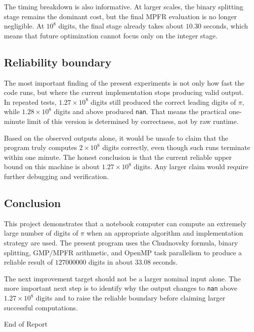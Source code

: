 \documentclass[12pt,a4paper]{article}
\begin{document}
The timing breakdown is also informative. At larger scales, the binary splitting stage remains the dominant cost, but the final MPFR evaluation is no longer negligible. At $10^8$ digits, the final stage already takes about $10.30$ seconds, which means that future optimization cannot focus only on the integer stage.

\subsection{Reliability boundary}

The most important finding of the present experiments is not only how fast the code runs, but where the current implementation stops producing valid output. In repeated tests, $1.27\times 10^8$ digits still produced the correct leading digits of $\pi$, while $1.28\times 10^8$ digits and above produced \texttt{nan}. That means the practical one-minute limit of this version is determined by correctness, not by raw runtime.

Based on the observed outputs alone, it would be unsafe to claim that the program truly computes $2\times 10^8$ digits correctly, even though such runs terminate within one minute. The honest conclusion is that the current reliable upper bound on this machine is about $1.27\times 10^8$ digits. Any larger claim would require further debugging and verification.

\subsection{Conclusion}

This project demonstrates that a notebook computer can compute an extremely large number of digits of $\pi$ when an appropriate algorithm and implementation strategy are used. The present program uses the Chudnovsky formula, binary splitting, GMP/MPFR arithmetic, and OpenMP task parallelism to produce a reliable result of $127000000$ digits in about $33.08$ seconds.

The next improvement target should not be a larger nominal input alone. The more important next step is to identify why the output changes to \texttt{nan} above $1.27\times 10^8$ digits and to raise the reliable boundary before claiming larger successful computations.

\vfill
\begin{center}
{\fontsize{28}{32}\selectfont\calligra End of Report}
\end{center}
\vspace*{2em}
\end{document}
